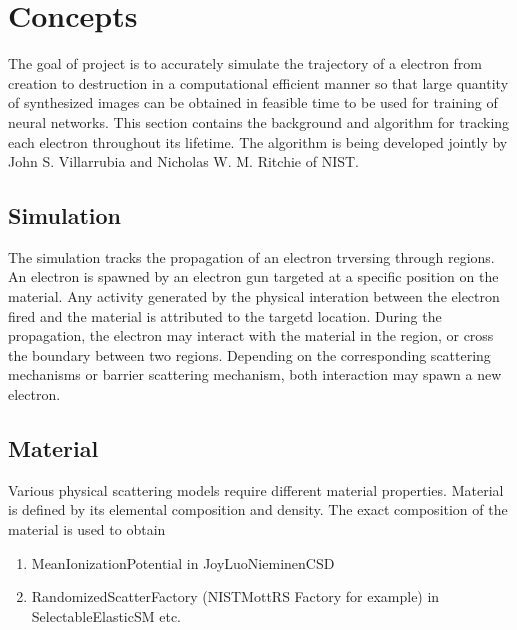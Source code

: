 \chapter{Concepts}\label{con}
The goal of project is to accurately simulate the trajectory of a electron from creation to destruction in a computational efficient manner so that large quantity of synthesized images can be obtained in feasible time to be used for training of neural networks. This section contains the background and algorithm for tracking each electron throughout its lifetime. The algorithm is being developed jointly by John S.  Villarrubia and Nicholas W. M. Ritchie of NIST.

\section{Simulation}\label{con:monte_carlo_ss}

The simulation tracks the propagation of an electron trversing through regions. An electron is spawned by an electron gun targeted at a specific position on the material. Any activity generated by the physical interation between the electron fired and the material is attributed to the targetd location. During the propagation, the electron may interact with the material in the region, or cross the boundary between two regions. Depending on the corresponding scattering mechanisms or barrier scattering mechanism, both interaction may spawn a new electron.

\section{Material}\label{con:material}
Various physical scattering models require different material properties. Material is defined by its elemental composition and density. The exact composition of the material is used to obtain 
\begin{enumerate}
\item MeanIonizationPotential in JoyLuoNieminenCSD
\item RandomizedScatterFactory (NISTMottRS Factory for example) in SelectableElasticSM etc.
\end{enumerate}

